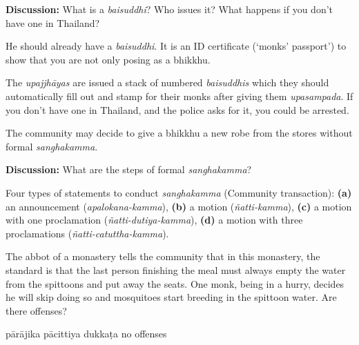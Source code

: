 \begin{exam}{\autoExamName}
\begin{problem*}
\begin{parts}
    \bigskip

    \textbf{Discussion:} What is a \emph{baisuddhi}? Who issues it? What happens if you don't have one in Thailand?

    \begin{solution}
      He should already have a \emph{baisuddhi}. It is an ID certificate
      (`monks' passport') to show that you are not only posing as a bhikkhu.

      The \emph{upajjhāyas} are issued a stack of numbered \emph{baisuddhis}
      which they should automatically fill out and stamp for their monks after
      giving them \emph{upasampada}. If you don't have one in Thailand, and the
      police asks for it, you could be arrested.
    \end{solution}

  \item {} The community may decide to give a bhikkhu a new robe from the stores without formal \emph{sanghakamma}. 

    \bigskip

    \textbf{Discussion:} What are the steps of formal \emph{sanghakamma}?

  \begin{solution}
    Four types of statements to conduct \emph{sanghakamma} (Community transaction):
    \textbf{(a)} an announcement (\emph{apalokana-kamma}),
    \textbf{(b)} a motion (\emph{ñatti-kamma}),
    \textbf{(c)} a motion with one proclamation (\emph{ñatti-dutiya-kamma}),
    \textbf{(d)} a motion with three proclamations (\emph{ñatti-catuttha-kamma}).
  \end{solution}

  \end{parts}

\end{problem*}

\problemDivide

\begin{problem}

  The abbot of a monastery tells the community that in this monastery, the
  standard is that the last person finishing the meal must always empty the
  water from the spittoons and put away the seats. One monk, being in a hurry,
  decides he will skip doing so and mosquitoes start breeding in the spittoon water. Are there
  offenses?

  \bigskip

  \begin{answers}{4}
    \bChoices
     pārājika\eAns
     pācittiya\eAns
     dukkaṭa\eAns
     no offenses\eAns
    \eChoices
  \end{answers}


\end{problem}
\end{exam}
